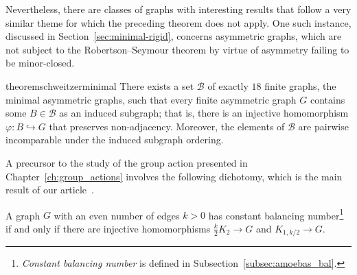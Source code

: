 Nevertheless, there are classes of graphs with interesting results that follow a very similar theme for which the preceding theorem does not apply.
One such instance, discussed in Section~\ref{sec:minimal-rigid}, concerns asymmetric graphs, which are not subject to the Robertson--Seymour theorem by virtue of asymmetry failing to be minor-closed.

\begin{restatable}{theorem}{schweitzerminimal}\label {thm:schweitzer-minimal}
	There exists a set $\mathcal{B}$ of exactly $18$ finite graphs, the minimal asymmetric graphs, such that every finite asymmetric graph $G$ contains some $B \in \mathcal{B}$ as an induced subgraph; that is, there is an injective homomorphism $\varphi\colon B \hookrightarrow G$ that preserves non-adjacency.
	Moreover, the elements of $\mathcal{B}$ are pairwise incomparable under the induced subgraph ordering.
\end{restatable}

A precursor to the study of the group action presented in Chapter~\ref{ch:group_actions} involves the following dichotomy, which is the main result of our article~\cite{Caroetal2023}.

\begin{theorem}
    A graph $G$ with an even number of edges $k>0$ has constant balancing number\footnote{\emph{Constant balancing number} is defined in Subsection~\ref{subsec:amoebas_bal}.} if and only if there are injective homomorphisms $\frac{k}2K_2\to G$ and $K_{1,k/2}\to G$.
\end{theorem}